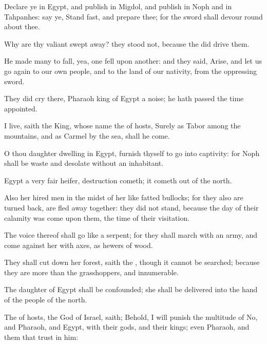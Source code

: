 {Declare ye in
Egypt, and
publish in
Migdol, and
publish in
Noph and in
Tahpanhes:
say ye, Stand
fast, and
prepare thee; for the
sword shall
devour round
about thee.

Why are thy
valiant
{} swept
away? they
stood not, because the
{} did
drive them.

He made
many to
fall, yea,
one
fell upon
another: and they
said,
Arise, and let us go
again to our own
people, and to the
land of our
nativity,
from the
oppressing
sword.

They did
cry there,
Pharaoh
king of
Egypt
{} a
noise; he hath
passed the time
appointed.

 I
live,
saith the
King, whose
name
{} the
{} of
hosts, Surely as
Tabor
{} among the
mountains, and as
Carmel by the
sea,
{} shall he
come.

O thou
daughter
dwelling in
Egypt,
furnish thyself to go into
captivity: for
Noph shall be
waste and
desolate without an
inhabitant.

Egypt
{} a very
fair
heifer,
{}
destruction
cometh; it cometh
out of the
north.

Also her hired
men
{} in the
midst of her like
fatted
bullocks; for they also are turned
back,
{} are fled
away
together: they did not
stand, because the
day of their
calamity was
come upon them,
{} the
time of their
visitation.

The
voice thereof shall
go like a
serpent; for they shall
march with an
army, and
come against her with
axes, as
hewers of
wood.

They shall cut
down her
forest,
saith the
{}, though it cannot be
searched; because they are
more than the
grasshoppers, and
{}
innumerable.

The
daughter of
Egypt shall be
confounded; she shall be
delivered into the
hand of the
people of the
north.

The
{} of
hosts, the
God of
Israel,
saith; Behold, I will
punish the
multitude of
No, and
Pharaoh, and
Egypt, with their
gods, and their
kings; even
Pharaoh, and
{} them that
trust in him:

}
